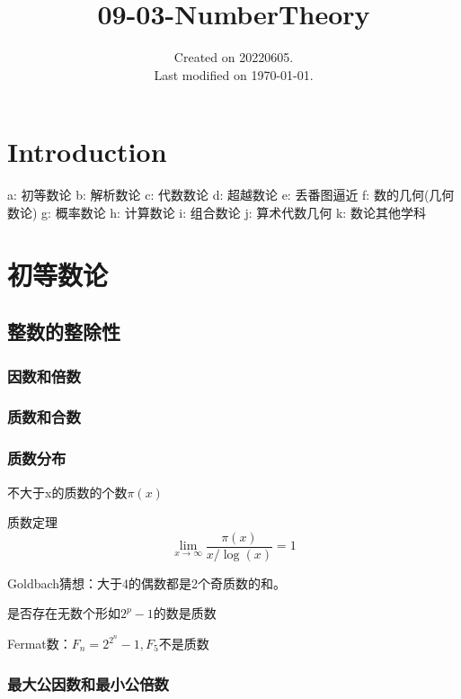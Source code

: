 \documentclass[UTF8]{../09-Mathematics}
\begin{document}
\title{09-03-NumberTheory}
\date{Created on 20220605.\\   Last modified on \today.}
\maketitle
\tableofcontents


\chapter{Introduction}



a: 初等数论
b: 解析数论
c: 代数数论
d: 超越数论
e: 丢番图逼近
f: 数的几何(几何数论)
g: 概率数论
h: 计算数论
i: 组合数论
j: 算术代数几何
k: 数论其他学科

\chapter{初等数论}

\section{整数的整除性}

\subsection{因数和倍数}

\subsection{质数和合数}

\subsection{质数分布}
不大于x的质数的个数$\pi(x)$

\begin{proposition}
    质数定理
    $$  \lim_{x \to \infty} \frac{\pi(x)}{x/ \log (x)}  =1  $$
\end{proposition}


\begin{proposition}
    Goldbach猜想：大于4的偶数都是2个奇质数的和。
\end{proposition}


是否存在无数个形如$2^p-1$的数是质数


Fermat数：$F_n = 2^{2^{n}}-1, F_5$不是质数


\subsection{最大公因数和最小公倍数}
\end{document}
